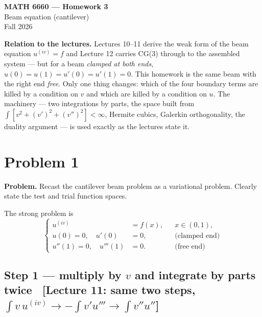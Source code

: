 \documentclass[11pt]{article}
\newcommand{\src}[1]{{\small\color{black!55}\textsf{[#1]}}}
\begin{document}
\begin{center}
  {\large\bfseries MATH 6660 --- Homework 3}\\[2pt]
  {\normalsize Beam equation (cantilever)}\\[2pt]
  {\small Fall 2026}
\end{center}

\vspace{4pt}

{\small\color{black!60}
\textbf{Relation to the lectures.}  Lectures 10--11 derive the weak form of the
beam equation $u^{(iv)}=f$ and Lecture 12 carries CG(3) through to the assembled
system --- but for a beam \emph{clamped at both ends},
$u(0)=u(1)=u'(0)=u'(1)=0$.  This homework is the same beam with the right end
\emph{free}.  Only one thing changes: which of the four boundary terms are
killed by a condition on $v$ and which are killed by a condition on $u$.  The
machinery --- two integrations by parts, the space built from
$\int[v^{2}+(v')^{2}+(v'')^{2}]<\infty$, Hermite cubics, Galerkin orthogonality,
the duality argument --- is used exactly as the lectures state it.}

\vspace{4pt}

\section*{Problem 1}

\textbf{Problem.} Recast the cantilever beam problem as a variational problem.
Clearly state the test and trial function spaces.

\medskip
The strong problem is
\begin{equation}\label{eq:bvp}
  \left\{
  \begin{aligned}
    u^{(iv)}&=f(x), && x\in(0,1),\\
    u(0)=0,\quad u'(0)&=0, &&\text{(clamped end)}\\
    u''(1)=0,\quad u'''(1)&=0. &&\text{(free end)}
  \end{aligned}\right.
\end{equation}

\subsection*{Step 1 --- multiply by $v$ and integrate by parts twice
  \ \src{Lecture 11: same two steps, \ \ $\int v\,u^{(iv)}\to-\int v'u'''\to\int v''u''$}}
\end{document}
